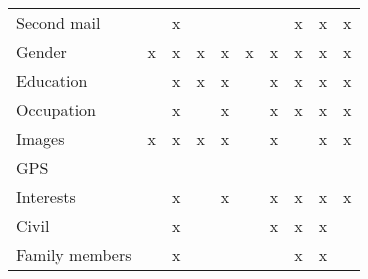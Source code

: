 \begin{table}
\begin{tabular}{llllllllll}
    Second mail     &     & x     &       &       &         &       & x    & x   & x   \\
    Gender          & x   & x     & x     & x     & x       & x     & x    & x   & x   \\
    Education       &     & x     & x     & x     &         & x     & x    & x   & x   \\
    Occupation      &     & x     &       & x     &         & x     & x    & x   & x   \\
    Images          & x   & x     & x     & x     &         & x     &      & x   & x   \\
    GPS             &     &       &       &       &         &       &      &     &     \\
    Interests       &     & x     &       & x     &         & x     & x    & x   & x   \\
    Civil           &     & x     &       &       &         & x     & x    & x   &     \\
    Family members  &     & x     &       &       &         &       & x    & x   &     \\
    \end{tabular}
\end{table}
